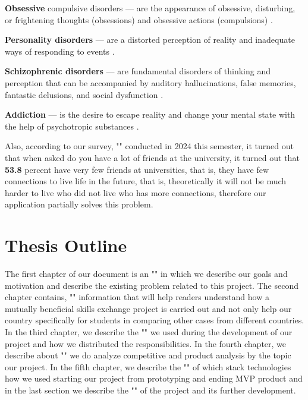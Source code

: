\par
\vspace{0.5cm}
\textbf{Obsessive} compulsive disorders — are the appearance of obsessive, disturbing, or frightening thoughts (obsessions) and obsessive actions (compulsions) \cite{student-fears}.

\par
\vspace{0.5cm}
\textbf{Personality disorders}  —  are a distorted perception of reality and inadequate ways of responding to events \cite{student-fears}.

\par
\vspace{0.5cm}
\textbf{Schizophrenic disorders} — are fundamental disorders of thinking and perception that can be accompanied by auditory hallucinations, false memories, fantastic delusions, and social dysfunction \cite{student-fears}.

\par
\vspace{0.5cm}
\textbf{Addiction} — is the desire to escape reality and change your mental state with the help of psychotropic substances \cite{student-fears}.

\vspace{0.5cm}
Also, according to our survey, "" conducted in 2024 this semester, it turned out that when asked do you have a lot of friends at the university, it turned out that \textbf{53.8} percent have very few friends at universities, that is, they have few connections to live life in the future, that is, theoretically it will not be much harder to live who did not live who has more connections, therefore our application partially solves this problem.

\newpage
\section{Thesis Outline}\label{thesis}
The first chapter of our document is an "" in which we describe our goals and motivation and describe the existing problem related to this project. The second chapter contains, "" information that will help readers understand how a mutually beneficial skills exchange project is carried out and not only help our country specifically for students in comparing other cases from different countries. In the third chapter, we describe the "" we used during the development of our project and how we distributed the responsibilities. In the fourth chapter, we describe about "" we do analyze competitive and product analysis by the topic our project. In the fifth chapter, we describe the "" of which stack technologies how we used starting our project from prototyping and ending MVP product and in the last section we describe the "" of the project and its further development.
